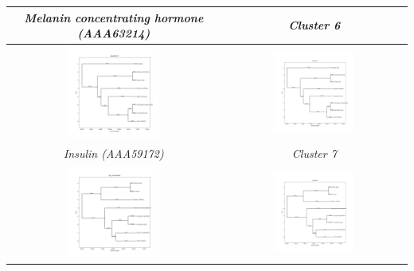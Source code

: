 \documentclass[11pt, a4paper, hidelinks]{article}
\begin{document}
\begin{longtable}{|c|c|}
        \hline
        \textit{Melanin concentrating hormone (AAA63214)} & \textit{Cluster 6} \\
        \hline
        \includegraphics[width=0.45\textwidth]{AAA59172.png} &
        \includegraphics[width=0.45\textwidth]{Cluster 7.png} \\
        \hline
        \textit{Insulin (AAA59172)} & \textit{Cluster 7} \\
        \hline
        \includegraphics[width=0.45\textwidth]{NP_001381685.png} &
        \includegraphics[width=0.45\textwidth]{Cluster 0.png} \\

\end{longtable}
\end{document}
